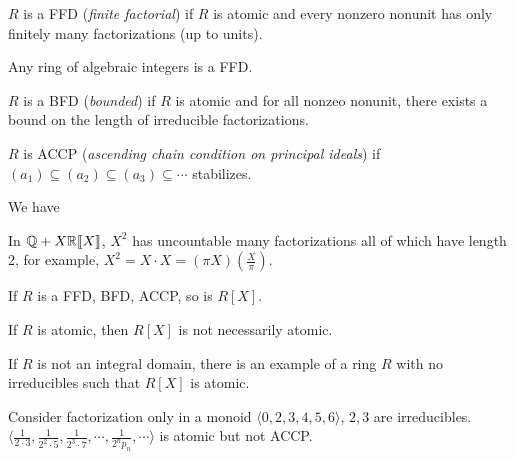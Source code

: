 \begin{definition}\label{1.90}
    $R$ is a FFD (\emph{finite factorial}) if $R$ is atomic and every nonzero nonunit has only finitely many factorizations (up to units).
\end{definition}

\begin{example}\label{1.91}
    Any ring of algebraic integers is a FFD.
\end{example}

\begin{definition}\label{1.92}
    $R$ is a BFD (\emph{bounded}) if $R$ is atomic and for all nonzeo nonunit, there exists a bound on the length of irreducible factorizations. 
\end{definition}

\begin{definition}\label{1.93}
    $R$ is ACCP (\emph{ascending chain condition on principal ideals}) if $(a_1) \subseteq (a_2) \subseteq (a_3) \subseteq \cdots$ stabilizes.
\end{definition}

\begin{proposition}\label{1.94}
    We have 
    \begin{center} 
    \end{center}
\end{proposition}

\begin{example}\label{1.95}
    In $\mathbb{Q}+X\mathbb{R}\llbracket X \rrbracket$, $X^{2}$ has uncountable many factorizations all of which have length 2, for example, $X^{2} = X \cdot X = (\pi X)(\frac{X}{\pi})$. 
\end{example}

\begin{fact}\label{1.96}
    If $R$ is a FFD, BFD, ACCP, so is $R[X]$.
\end{fact}

\begin{fact}\label{1.97}
    If $R$ is atomic, then $R[X]$ is not necessarily atomic.
\end{fact}

\begin{fact}\label{1.98}
    If $R$ is not an integral domain, there is an example of a ring $R$ with no irreducibles such that $R[X]$ is atomic.
\end{fact}

\begin{example}\label{1.99}
    Consider factorization only in a monoid $\langle 0,2,3,4,5,6 \rangle$, $2,3$ are irreducibles. $\langle \frac{1}{2 \cdot 3}, \frac{1}{2^{2} \cdot 5}, \frac{1}{2^{3} \cdot 7},\cdots,\frac{1}{2^{n}p_n}, \cdots \rangle$ is atomic but not ACCP.
\end{example}
